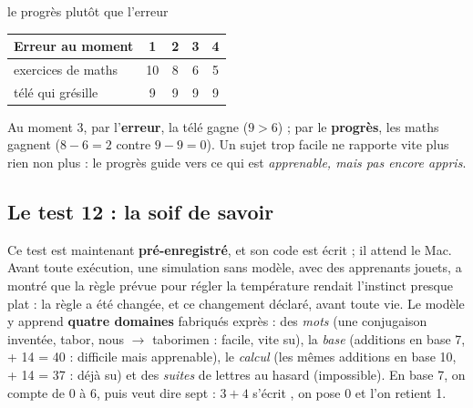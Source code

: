\documentclass[fontsize=10pt,paper=a4,parskip=half-]{scrartcl}
\newcommand{\q}[1]{\og #1\fg{}}
\begin{document}
\begin{calcul}{le progrès plutôt que l'erreur}
\begin{minipage}{0.55\linewidth}
\raggedright\small
\begin{tabular}{lcccc}
\toprule
Erreur au moment & 1 & 2 & 3 & 4\\
\midrule
exercices de maths & 10 & 8 & 6 & 5\\
télé qui grésille & 9 & 9 & 9 & 9\\
\bottomrule
\end{tabular}

\smallskip\normalsize
Au moment 3, par l'\textbf{erreur}, la télé gagne ($9 > 6$) ; par le \textbf{progrès}, les
maths gagnent ($8-6 = 2$ contre $9-9 = 0$). Un sujet trop facile ne rapporte vite plus
rien non plus : le progrès guide vers ce qui est \emph{apprenable, mais pas encore appris}.
\end{minipage}\hfill
\begin{minipage}{0.4\linewidth}
\centering
{}
\end{minipage}
\end{calcul}

\subsection{Le test 12 : la soif de savoir}
Ce test est maintenant \textbf{pré-enregistré}, et son code est écrit ; il attend le Mac.
Avant toute exécution, une simulation sans modèle, avec des apprenants jouets, a montré
que la règle prévue pour régler la température rendait l'instinct presque plat : la règle a
été changée, et ce changement déclaré, avant toute vie. Le modèle y apprend \textbf{quatre domaines} fabriqués exprès : des
\emph{mots} (une conjugaison inventée, \q{tabor, nous $\to$ taborimen} : facile, vite su), la
\emph{base} (additions en base 7, \q{23 + 14 = 40} : difficile mais apprenable), le
\emph{calcul} (les mêmes additions en base 10, \q{23 + 14 = 37} : déjà su) et des
\emph{suites} de lettres au hasard (impossible). En base 7, on compte de 0 à 6, puis
\q{10} veut dire sept : $3+4$ s'écrit \q{10}, on pose 0 et l'on retient 1.
\end{document}
